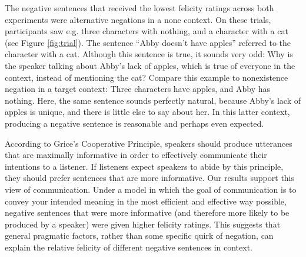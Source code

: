 \documentclass[10pt,letterpaper]{article}
\begin{document}
The negative sentences that received the lowest felicity ratings across both experiments were alternative negations in a none context.  On these trials, participants saw e.g. three characters with nothing, and a character with a cat (see Figure \ref{fig:trial}).  The sentence ``Abby doesn't have apples'' referred to the character with a cat.  Although this sentence is true, it sounds very odd: Why is the speaker talking about Abby's lack of apples, which is true of everyone in the context, instead of mentioning the cat?  Compare this example to nonexistence negation in a target context: Three characters have apples, and Abby has nothing.  Here, the same sentence sounds perfectly natural, because Abby's lack of apples is unique, and there is little else to say about her.  In this latter context, producing a negative sentence is reasonable and perhaps even expected.

According to Grice's Cooperative Principle, speakers should produce utterances that are maximally informative in order to effectively communicate their intentions to a listener.  If listeners expect speakers to abide by this principle, they should prefer sentences that are more informative.  Our results support this view of communication.  Under a model in which the goal of communication is to convey your intended meaning in the most efficient and effective way possible, negative sentences that were more informative (and therefore more likely to be produced by a speaker) were given higher felicity ratings.  This suggests that general pragmatic factors, rather than some specific quirk of negation, can explain the relative felicity of different negative sentences in context.  










 
\end{document}

